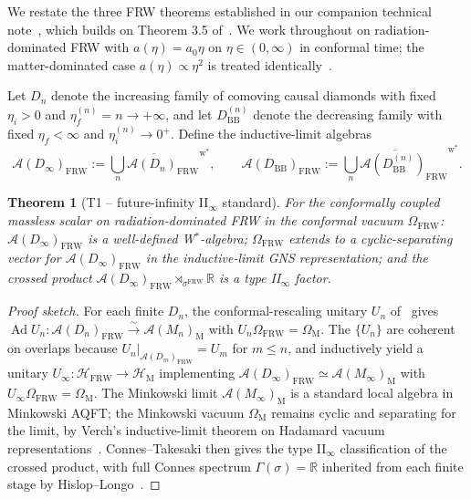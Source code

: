 \documentclass[11pt]{article}
\newtheorem{theorem}{Theorem}
\theoremstyle{definition}
\newcommand{\R}{\mathbb{R}}
\newcommand{\HH}{\mathcal{H}}
\renewcommand{\AA}{\mathcal{A}}
\newcommand{\Ad}{\operatorname{Ad}}
\newcommand{\FRW}{\mathrm{FRW}}
\newcommand{\Mink}{\mathrm{M}}
\newcommand{\BB}{\mathrm{BB}}
\begin{document}
We restate the three FRW theorems established in our companion technical note~\cite{algebraic_arrow}, which builds on Theorem 3.5 of~\cite{frw_note}. We work throughout on radiation-dominated FRW with $a(\eta)=a_0\eta$ on $\eta\in(0,\infty)$ in conformal time; the matter-dominated case $a(\eta)\propto\eta^2$ is treated identically~\cite[Theorem 3.6]{frw_note}.

Let $D_n$ denote the increasing family of comoving causal diamonds with fixed $\eta_i>0$ and $\eta_f^{(n)}=n\to+\infty$, and let $D_\BB^{(n)}$ denote the decreasing family with fixed $\eta_f<\infty$ and $\eta_i^{(n)}\to 0^+$. Define the inductive-limit algebras
\begin{equation}\label{eq:Dlims-frw}
\AA(D_\infty)_\FRW := \overline{\bigcup_n \AA(D_n)_\FRW}^{\mathrm{w}^*},
\qquad
\AA(D_\BB)_\FRW := \overline{\bigcup_n \AA(D_\BB^{(n)})_\FRW}^{\mathrm{w}^*}.
\end{equation}

\begin{theorem}[T1 -- future-infinity II$_\infty$ standard]\label{thm:T1}
For the conformally coupled massless scalar on radiation-dominated FRW in the conformal vacuum $\Omega_\FRW$: $\AA(D_\infty)_\FRW$ is a well-defined W$^*$-algebra; $\Omega_\FRW$ extends to a cyclic-separating vector for $\AA(D_\infty)_\FRW$ in the inductive-limit GNS representation; and the crossed product $\AA(D_\infty)_\FRW\rtimes_{\sigma^\FRW}\R$ is a type II$_\infty$ factor.
\end{theorem}

\begin{proof}[Proof sketch]
For each finite $D_n$, the conformal-rescaling unitary $U_n$ of~\cite[Prop.~3.3]{frw_note} gives $\Ad U_n:\AA(D_n)_\FRW\xrightarrow{\sim}\AA(M_n)_\Mink$ with $U_n\Omega_\FRW=\Omega_\Mink$. The $\{U_n\}$ are coherent on overlaps because $U_n|_{\AA(D_m)_\FRW}=U_m$ for $m\le n$, and inductively yield a unitary $U_\infty:\HH_\FRW\to\HH_\Mink$ implementing $\AA(D_\infty)_\FRW\simeq\AA(M_\infty)_\Mink$ with $U_\infty\Omega_\FRW=\Omega_\Mink$. The Minkowski limit $\AA(M_\infty)_\Mink$ is a standard local algebra in Minkowski AQFT; the Minkowski vacuum $\Omega_\Mink$ remains cyclic and separating for the limit, by Verch's inductive-limit theorem on Hadamard vacuum representations~\cite{Verch1997}. Connes--Takesaki then gives the type II$_\infty$ classification of the crossed product, with full Connes spectrum $\Gamma(\sigma)=\R$ inherited from each finite stage by Hislop--Longo~\cite{HislopLongo1982}.
\end{proof}
\end{document}
